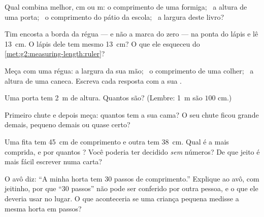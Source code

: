 \begin{exercise}[$\star$]\label{exo:g2:measuring-length:4}
Qual  combina melhor, \unit{cm} ou \unit{m}: o comprimento de
uma formiga; \ a altura de uma porta; \ o comprimento do pátio da
escola; \ a largura deste livro?
\end{exercise}

\begin{exercise}[$\star$]\label{exo:g2:measuring-length:5}
Tim encosta a borda da régua --- e não a marca do zero --- na ponta
do lápis e lê \qty{13}{cm}. O lápis dele tem mesmo \qty{13}{cm}? O
que ele esqueceu do \cref{met:g2:measuring-length:ruler}?
\end{exercise}

\begin{exercise}[$\star$]\label{exo:g2:measuring-length:6}
Meça com uma régua: a largura da sua mão; \ o comprimento de uma
colher; \ a altura de uma caneca. Escreva cada resposta com a sua
.
\end{exercise}

\begin{exercise}[$\star$]\label{exo:g2:measuring-length:7}
Uma porta tem \qty{2}{m} de altura. Quantos  são?
(Lembre: \qty{1}{m} são $100$ \unit{cm}.)
\end{exercise}

\begin{exercise}[$\star$]\label{exo:g2:measuring-length:8}
Primeiro chute e depois meça: quantos  tem a sua cama? O seu
chute ficou grande demais, pequeno demais ou quase certo?
\end{exercise}

\begin{exercise}[$\star\star$]\label{exo:g2:measuring-length:9}
Uma fita tem \qty{45}{cm} de comprimento e outra tem \qty{38}{cm}.
Qual é a mais comprida, e por quantos ? Você poderia ter
decidido \emph{sem} números? De que jeito é mais fácil escrever numa
carta?
\end{exercise}

\begin{exercise}[$\star\star$]\label{exo:g2:measuring-length:10}
O avô diz: ``A minha horta tem $30$ passos de comprimento.'' Explique
ao avô, com jeitinho, por que ``$30$ passos'' não pode ser conferido
por outra pessoa, e o que ele deveria usar no lugar. O que
aconteceria se uma criança pequena medisse a mesma horta em passos?
\end{exercise}
